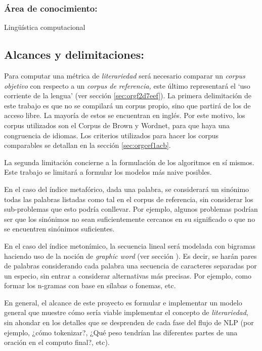 \documentclass[12pt,letterpaper,twoside]{article}
\begin{document}
\subsubsection{\textbf{Área de conocimiento:}}
\label{sec:orgee196b1}

Lingüística computacional

\subsection{Alcances y delimitaciones:}
\label{sec:orgf8803dd}

Para computar una métrica de \emph{literariedad} será necesario comparar un
\emph{corpus objetivo} con respecto a un \emph{corpus de referencia,} este
último representará el ‘uso corriente de la lengua' (ver sección
\ref{sec:orgf2d7eef}). La primera delimitación de este trabajo es que no se
compilará un corpus propio, sino que partirá de los de acceso
libre. La mayoría de estos se encuentran en inglés. Por este motivo,
los corpus utilizados son el Corpus de Brown y Wordnet, para
que haya una congruencia de idiomas. Los criterios
utilizados para hacer los corpus comparables se detallan en la sección
\ref{sec:orgcef1acb}.

La segunda limitación concierne a la formulación de los algoritmos en
sí mismos. Este trabajo se limitará a formular los modelos más naive
posibles.

En el caso del índice metafórico, dada una palabra, se
considerará un sinónimo todas las palabras listadas como tal en el
corpus de referencia, sin considerar los sub-problemas que esto podría
conllevar. Por ejemplo, algunos problemas podrían ser que los
sinónimos no sean suficientemente cercanos en su significado o que no
se encuentren sinónimos suficientes.

En el caso del índice metonímico, la secuencia lineal será modelada
con bigramas haciendo uso de la noción de \emph{graphic word} (ver sección
).  Es decir, se harán pares de palabras considerando cada
palabra una secuencia de caracteres separadas por un especio, sin
entrar a considerar alternativas más precisas. Por ejemplo, como
formar los n-gramas con base en sílabas o fonemas, etc.

En general, el alcance de este proyecto es formular e implementar un
modelo general que muestre cómo sería viable implementar el concepto de
\emph{literariedad}, sin ahondar en los detalles que se desprenden de cada
fase del flujo de NLP (por ejemplo, ¿cómo tokenizar?, ¿Qué peso tendrían
las diferentes partes de una oración en el computo final?, etc).
\end{document}
